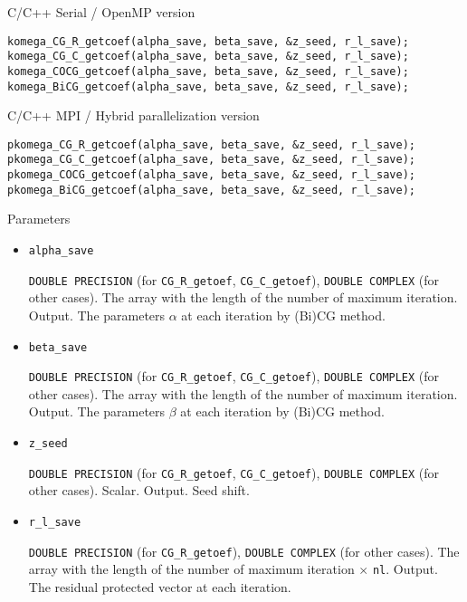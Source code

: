 \documentclass[12pt,titlepage]{article}
\begin{document}
\noindent C/C++ Serial / OpenMP version
\begin{verbatim}
komega_CG_R_getcoef(alpha_save, beta_save, &z_seed, r_l_save);
komega_CG_C_getcoef(alpha_save, beta_save, &z_seed, r_l_save);
komega_COCG_getcoef(alpha_save, beta_save, &z_seed, r_l_save);
komega_BiCG_getcoef(alpha_save, beta_save, &z_seed, r_l_save);
\end{verbatim}

\noindent C/C++ MPI / Hybrid parallelization version
\begin{verbatim}
pkomega_CG_R_getcoef(alpha_save, beta_save, &z_seed, r_l_save);
pkomega_CG_C_getcoef(alpha_save, beta_save, &z_seed, r_l_save);
pkomega_COCG_getcoef(alpha_save, beta_save, &z_seed, r_l_save);
pkomega_BiCG_getcoef(alpha_save, beta_save, &z_seed, r_l_save);
\end{verbatim}

\noindent Parameters

\begin{itemize}
\item \verb|alpha_save|

  \verb|DOUBLE PRECISION| (for \verb|CG_R_getoef|, \verb|CG_C_getoef|),
  \verb|DOUBLE COMPLEX| (for other cases).
  The array with the length of the number of maximum iteration. Output.
  The parameters $\alpha$ at each iteration by (Bi)CG method.

\item \verb|beta_save|

  \verb|DOUBLE PRECISION| (for \verb|CG_R_getoef|, \verb|CG_C_getoef|),
  \verb|DOUBLE COMPLEX| (for other cases).
  The array with the length of the number of maximum iteration. Output.
 The parameters $\beta$ at each iteration by (Bi)CG method.

\item \verb|z_seed|

  \verb|DOUBLE PRECISION| (for \verb|CG_R_getoef|, \verb|CG_C_getoef|),
  \verb|DOUBLE COMPLEX| (for other cases).
  Scalar. Output. Seed shift.

\item \verb|r_l_save|
  
  \verb|DOUBLE PRECISION| (for \verb|CG_R_getoef|),
  \verb|DOUBLE COMPLEX| (for other cases).
  The array with the length of the number of maximum iteration $\times$ \verb|nl|. Output.
  The residual protected vector at each iteration. 
\end{itemize}
\end{document}
